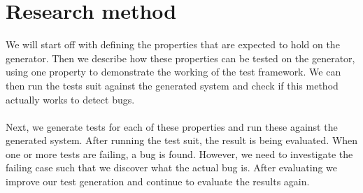 \section{Research method}
We will start off with defining the properties that are expected to hold on the generator. Then we describe how these properties can be tested on the generator, using one property to demonstrate the working of the test framework. We can then run the tests suit against the generated system and check if this method actually works to detect bugs.\\
\\
Next, we generate tests for each of these properties and run these against the generated system. After running the test suit, the result is being evaluated. When one or more tests are failing, a bug is found. However, we need to investigate the failing case such that we discover what the actual bug is. After evaluating we improve our test generation and continue to evaluate the results again.


